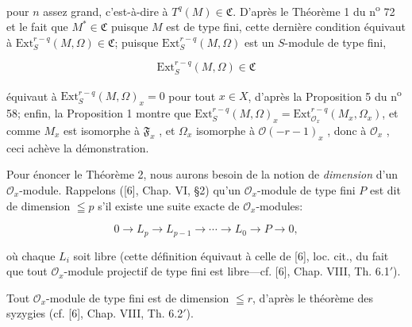 pour $n$ assez grand, c'est-à-dire à $T^q(M) \in \mathfrak{C}$. D'après le Théorème 1 du n\textsuperscript{o} 72 et le fait que $M^* \in \mathfrak{C}$ puisque $M$ est de type fini, cette dernière condition équivaut à $\mathrm{Ext}_S^{r-q}(M, \Omega) \in \mathfrak{C}$; puisque $\mathrm{Ext}_S^{r-q}(M, \Omega)$ est un $S$-module de type fini,

\begin{equation*}
\mathrm{Ext}_S^{r-q}(M, \Omega) \in \mathfrak{C}
\end{equation*}

équivaut à $\mathrm{Ext}_S^{r-q}(M, \Omega)_x = 0$ pour tout $x \in X$, d'après la Proposition 5 du n\textsuperscript{o} 58; enfin, la Proposition 1 montre que $\mathrm{Ext}_S^{r-q}(M, \Omega)_x = \mathrm{Ext}_{\mathcal{O}_x}^{r-q}(M_x , \Omega_x)$, et comme $M_x$ est isomorphe à $\mathfrak{F}_x$ , et $\Omega_x$ isomorphe à $\mathcal{O}(-r - 1)_x$ , donc à $\mathcal{O}_x$ , ceci achève la démonstration.

Pour énoncer le Théorème 2, nous aurons besoin de la notion de \textit{dimension} d'un $\mathcal{O}_x$-module. Rappelons ([6], Chap. VI, \S2) qu'un $\mathcal{O}_x$-module de type fini $P$ est dit de dimension $\leqq p$ s'il existe une suite exacte de $\mathcal{O}_x$-modules:

\begin{equation*}
0 \rightarrow L_p \rightarrow L_{p-1} \rightarrow \cdots \rightarrow L_0 \rightarrow P \rightarrow 0,
\end{equation*}

où chaque $L_i$ soit libre (cette définition équivaut à celle de [6], loc. cit., du fait que tout $\mathcal{O}_x$-module projectif de type fini est libre---cf. [6], Chap. VIII, Th. 6.1$'$).



%
%
%
Tout $\mathcal{O}_x$-module de type fini est de dimension $\leqq r$, d'après le théorème des syzygies (cf. [6], Chap. VIII, Th. 6.2$'$).

